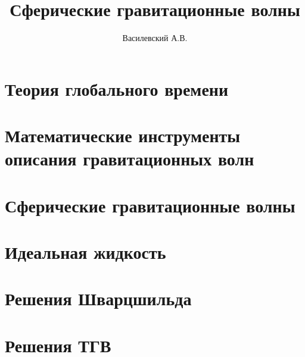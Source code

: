 \documentclass[12pt,a4paper]{article}
\title{Сферические гравитационные волны}
\author{Василевский А.В.}
\providecommand{\docroot}{../..}
\begin{document}
    \makedocroot

    \maketitle
    \tableofcontents

    \section{Теория глобального времени}
    

    \section{Математические инструменты описания гравитационных волн}
    

    \section{Сферические гравитационные волны}
    

    \section{Идеальная жидкость}
    

    \section{Решения Шварцшильда}
    

    \section{Решения ТГВ}
    
\end{document}
